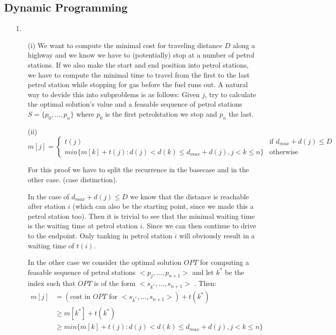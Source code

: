 \documentclass{article}
\begin{document}
\subsection*{Dynamic Programming}
\begin{itemize}
\item[1.] 
\begin{itemize}

\item[(i)] We want to compute the minimal cost for traveling distance $D$ along a highway and we know we have to (potentially) stop at a number of petrol stations. If we also make the start and end position into petrol stations, we have to compute the minimal time to travel from the first to the last petrol station while stopping for gas before the fuel runs out. A natural way to devide this into subproblems is as follows: Given $j$, try to calculate the optimal solution's value and a feasable sequence of petrol stations $S=\{p_0,...,p_n\}$ where $p_0$ is the first petrolstation we stop and $p_n$ the last. 

\item[(ii)]
      \[
      m[j] = \left\{
                   \begin{array}{ll}
                     t(j)   & \mbox{if $d_{max}+d(j)\le D$} \\
                     min\{ m[k] + t(j) : d(j) < d(k) \le d_{max} + d(j), j<k\le n\}  & \text{otherwise}
                   \end{array}
                \right.
      \]

For this proof we have to split the recurrence in the basecase and in the other case. (case distinction).

In the case of $d_{max}+d(j)\le D$ we know that the distance is reachable after station $i$ (which can also be the starting point, since we made this a petrol station too). Then it is trivial to see that the minimal waiting time is the waiting time at petrol station $i$. Since we can then continue to drive to the endpoint. Only tanking in petrol station $i$ will obviously result in a waiting time of $t(i)$.

In the other case we consider the optimal solution $OPT$ for computing a feasable sequence of petrol stations $<p_j,...,p_{n+1}>$ and let $k^*$ be the index such that $OPT$ is of the form $<s_{k^*},...,s_{n+1}>$ . Then:
\begin{align*}
m[j] &= (\text{cost in }OPT\text{ for }<s_{k^*},...,s_{n+1}>) + t(k^*) \\
&\ge m[k^*] + t(k^*)\\
&\ge min\{ m[k] + t(j) : d(j) < d(k) \le d_{max} + d(j), j<k\le n\}
\end{align*}


\end{itemize}
\end{itemize}
\end{document}
